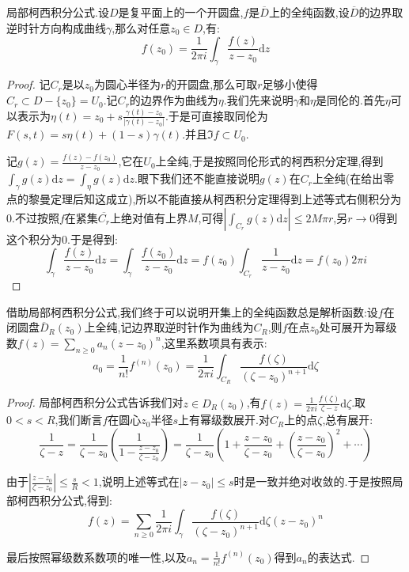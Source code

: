 局部柯西积分公式.设$D$是复平面上的一个开圆盘,$f$是$\overline{D}$上的全纯函数,设$\overline{D}$的边界取逆时针方向构成曲线$\gamma$,那么对任意$z_0\in D$,有:
$$f(z_0)=\frac{1}{2\pi i}\int_{\gamma}\frac{f(z)}{z-z_0}\mathrm{d}z$$
\begin{proof}
	
	记$C_r$是以$z_0$为圆心半径为$r$的开圆盘,那么可取$r$足够小使得$C_r\subset D-\{z_0\}=U_0$.记$C_r$的边界作为曲线为$\eta$.我们先来说明$\gamma$和$\eta$是同伦的.首先$\eta$可以表示为$\eta(t)=z_0+s\frac{\gamma(t)-z_0}{|\gamma(t)-z_0|}$.于是可直接取同伦为$F(s,t)=s\eta(t)+(1-s)\gamma(t)$.并且$\Im f\subset U_0$.
	
	记$g(z)=\frac{f(z)-f(z_0)}{z-z_0}$,它在$U_0$上全纯,于是按照同伦形式的柯西积分定理,得到$\int_{\gamma}g(z)\mathrm{d}z=\int_{\eta}g(z)\mathrm{d}z$.眼下我们还不能直接说明$g(z)$在$C_r$上全纯(在给出零点的黎曼定理后知这成立),所以不能直接从柯西积分定理得到上述等式右侧积分为0.不过按照$f$在紧集$\overline{C_r}$上绝对值有上界$M$,可得$\left|\int_{C_r}g(z)\mathrm{d}z\right|\le 2M\pi r$,另$r\to0$得到这个积分为0.于是得到:
	$$\int_{\gamma}\frac{f(z)}{z-z_0}\mathrm{d}z=\int_{\gamma}\frac{f(z_0)}{z-z_0}\mathrm{d}z=f(z_0)\int_{C_r}\frac{1}{z-z_0}\mathrm{d}z=f(z_0)2\pi i$$
\end{proof}

借助局部柯西积分公式,我们终于可以说明开集上的全纯函数总是解析函数:设$f$在闭圆盘$\overline{D}_R(z_0)$上全纯,记边界取逆时针作为曲线为$C_R$,则$f$在点$z_0$处可展开为幂级数$f(z)=\sum_{n\ge0} a_n(z-z_0)^n$,这里系数项具有表示:
$$a_0=\frac{1}{n!}f^{(n)}(z_0)=\frac{1}{2\pi i}\int_{C_R}\frac{f(\zeta)}{(\zeta-z_0)^{n+1}}\mathrm{d}\zeta$$
\begin{proof}
	
	局部柯西积分公式告诉我们对$z\in D_{R}(z_0)$,有$f(z)=\frac{1}{2\pi i}\frac{f(\zeta)}{\zeta-z}\mathrm{d}\zeta$.取$0<s<R$,我们断言$f$在圆心$z_0$半径$s$上有幂级数展开.对$C_R$上的点$\zeta$,总有展开:
	$$\frac{1}{\zeta-z}=\frac{1}{\zeta-z_0}\left(\frac{1}{1-\frac{z-z_0}{\zeta-z_0}}\right)=\frac{1}{\zeta-z_0}\left(1+\frac{z-z_0}{\zeta-z_0}+\left(\frac{z-z_0}{\zeta-z_0}\right)^2+\cdots\right)$$
	
	由于$\left|\frac{z-z_0}{\zeta-z_0}\right|\le\frac{s}{R}<1$,说明上述等式在$|z-z_0|\le s$时是一致并绝对收敛的.于是按照局部柯西积分公式,得到:
	$$f(z)=\sum_{n\ge0}\frac{1}{2\pi i}\int_{\gamma}\frac{f(\zeta)}{(\zeta-z_0)^{n+1}}\mathrm{d}\zeta (z-z_0)^n$$
	
	最后按照幂级数系数项的唯一性,以及$a_n=\frac{1}{n!}f^{(n)}(z_0)$得到$a_n$的表达式.
\end{proof}

